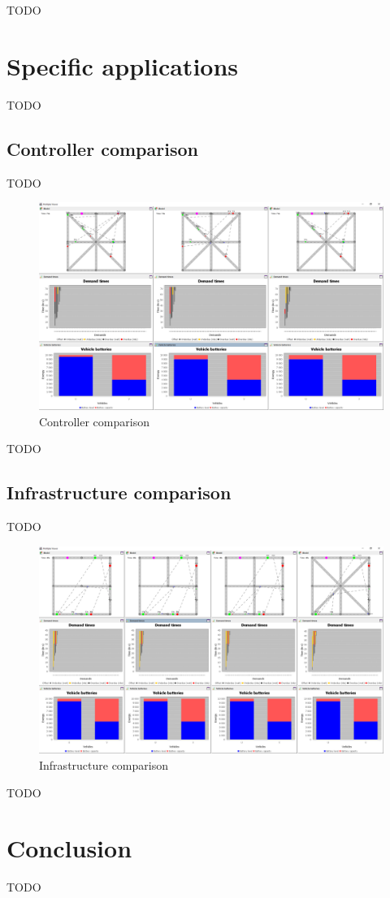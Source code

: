 \documentclass[11pt,twocolumn]{article}
\begin{document}
TODO

\section{Specific applications}
\label{sec:application}

TODO

\subsection{Controller comparison}
\label{sec:controller-comparison}

TODO

\begin{figure}[htbp]
    \includegraphics[width=\columnwidth]{../../screenshots/controller-comparison.png}
    \caption{Controller comparison}
    \label{fig:controller-comparison}
\end{figure}

TODO

\subsection{Infrastructure comparison}
\label{sec:infrastructure-comparison}

TODO

\begin{figure}[htbp]
    \includegraphics[width=\columnwidth]{../../screenshots/infrastructure-comparison.png}
    \caption{Infrastructure comparison}
    \label{fig:infratructure-comparison}
\end{figure}

TODO

\section{Conclusion}
\label{sec:conclusion}

TODO



\end{document}
